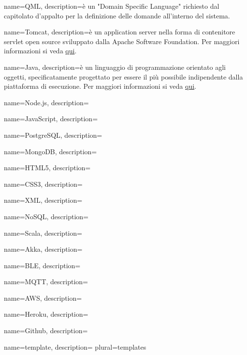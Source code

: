  {
	name=QML,
	description={è un "Domain Specific Language" richiesto dal capitolato d'appalto per la definizione delle domande all'interno del sistema.}
}

 {
	name=Tomcat,
	description={è un application server nella forma di contenitore servlet open source sviluppato dalla Apache Software Foundation. Per maggiori informazioni si veda \href{https://it.wikipedia.org/wiki/Apache_Tomcat}{qui}.}
}

 {
	name=Java,
	description={è un linguaggio di programmazione orientato agli oggetti, specificatamente progettato per essere il più possibile indipendente dalla piattaforma di esecuzione. Per maggiori informazioni si veda \href{https://it.wikipedia.org/wiki/Java_(linguaggio_di_programmazione)}{qui}.}
}

 {
	name=Node.js,
	description={\TODO{}}
}

 {
	name=JavaScript,
	description={\TODO{}}
}

 {
	name=PostgreSQL,
	description={\TODO{}}
}

 {
	name=MongoDB,
	description={\TODO{}}
}

 {
	name=HTML5,
	description={\TODO{}}
}

 {
	name=CSS3,
	description={\TODO{}}
}

 {
	name=XML,
	description={\TODO{}}
}

 {
	name=NoSQL,
	description={\TODO{}}
}

 {
	name=Scala,
	description={\TODO{}}
}

 {
	name=Akka,
	description={\TODO{}}
}

 {
	name=BLE,
	description={\TODO{}}
}

 {
	name=MQTT,
	description={\TODO{}}
}

 {
	name=AWS,
	description={\TODO{}}
}

 {
	name=Heroku,
	description={\TODO{}}
}

 {
	name=Github,
	description={\TODO{}}
}

 {
	name=template,
	description={\TODO{}}
	plural=templates
}

